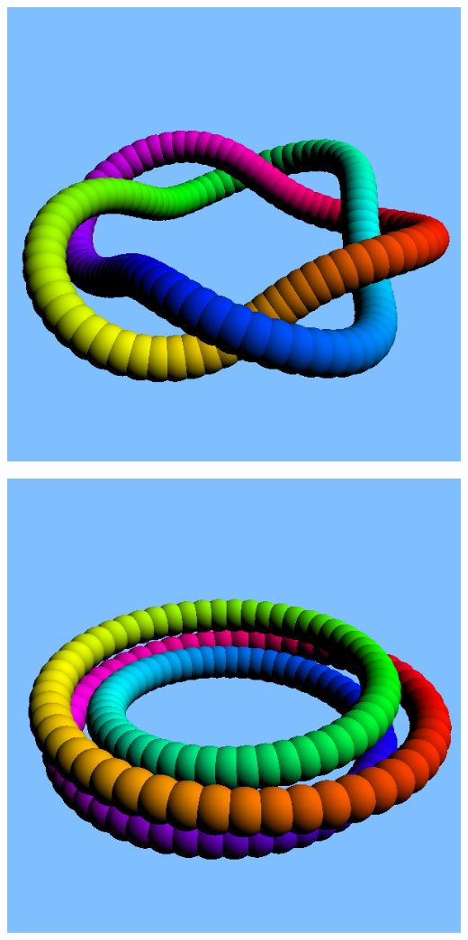 \documentclass{article}
\begin{document}
\begin{description}
\begin{center}
      {\includegraphics[scale=0.5]{ring01.png}}

      {\includegraphics[scale=0.5]{ring03.png}}


\end{center}
\end{description}
\end{document}
